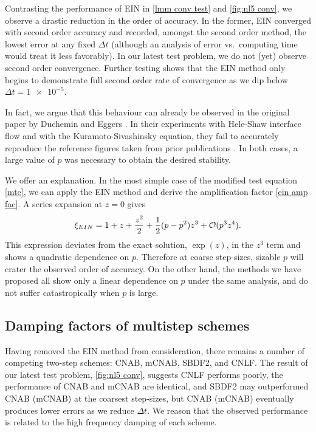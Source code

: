 Contrasting the performance of EIN in \cref{lmm conv test} and \cref{fig:nl5 conv}, we observe a drastic reduction in the order of accuracy. In the former, EIN converged with second order accuracy and recorded, amongst the second order method, the lowest error at any fixed $\Delta t$ (although an analysis of error vs.\ computing time would treat it less favorably). In our latest test problem, we do not (yet) observe second order convergence. Further testing shows that the EIN method only begins to demonstrate full second order rate of convergence as we dip below $\Delta t=\num{1e-5}$.

In fact, we argue that this behaviour can already be observed in the original paper by Duchemin and Eggers \cite{duchemin2014explicit}. In their experiments with Hele-Shaw interface flow and with the Kuramoto-Sivashinsky equation, they fail to accurately reproduce the reference figures taken from prior publications \cite{hou1994removing,kassam2005fourth}. In both cases, a large value of $p$ was necessary to obtain the desired stability. 

We offer an explanation. In the most simple case of the modified test equation \cref{mte}, we can apply the EIN method and derive the amplification factor \cref{ein amp fac}. A series expansion at $z=0$ gives 
\begin{align}
        \xi_{EIN}
= 1 + z + \frac{z^2}{2} + \frac{1}{2}(p-p^2)z^3 + \mathcal{O}(p^3z^4).
\end{align}
This expression deviates from the exact solution, $\exp(z)$, in the $z^3$ term  and shows a quadratic dependence on $p$. Therefore at coarse step-sizes, sizable $p$ will crater the observed order of accuracy. 
On the other hand, the methods we have proposed all show only a linear dependence on $p$ under the same analysis, and do not suffer catastropically when $p$ is large.

\subsection{Damping factors of multistep schemes}
Having removed the EIN method from consideration, there remains a number of competing two-step schemes: CNAB, mCNAB, SBDF2, and CNLF. The result of our latest test problem, \cref{fig:nl5 conv}, suggests CNLF performs poorly, the performance of CNAB and mCNAB are identical, and SBDF2 may outperformed CNAB (mCNAB) at the coarsest step-sizes, but CNAB (mCNAB) eventually produces lower errors as we reduce $\Delta t$.
We reason that the observed performance is related to the high frequency damping of each scheme. 

